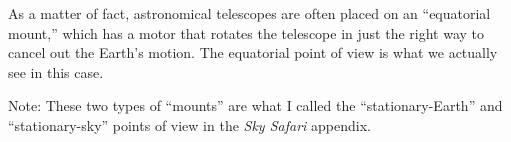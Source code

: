 As a matter of fact, astronomical telescopes are often
placed on an ``equatorial mount,'' which has a motor that 
rotates the telescope
in just the right way to cancel out the Earth's  motion. The 
equatorial point of view is what we actually see in this case.  

Note: These two types of ``mounts'' are what I called the
``stationary-Earth'' and ``stationary-sky'' points of view
in the \textit{Sky Safari} appendix. 
